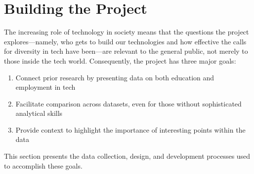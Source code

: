 \documentclass{article}
\begin{document}
\section{Building the Project}\label{sec:methodology}
The increasing role of technology in society means that the questions the project explores---namely, who gets to build our technologies and how effective the calls for diversity in tech have been---are relevant to the general public, not merely to those inside the tech world. Consequently, the project has three major goals:
\begin{enumerate}
  \item Connect prior research by presenting data on both education and employment in tech
  \item Facilitate comparison across datasets, even for those without sophisticated analytical skills
  \item Provide context to highlight the importance of interesting points within the data
\end{enumerate}

This section presents the data collection, design, and development processes used to accomplish these goals.










\clearpage


\end{document}
